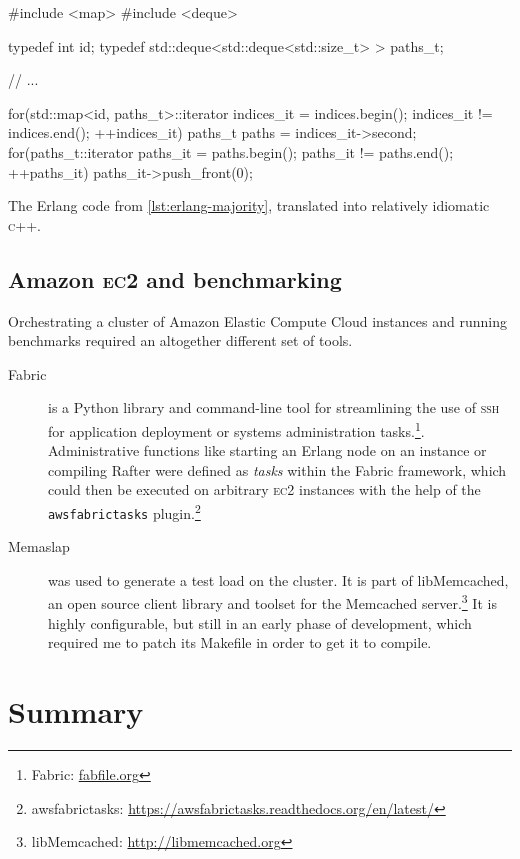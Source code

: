 \documentclass[draft,11pt,chapterprefix=true,toc=bibliography,numbers=noendperiod,
               footnotes=multiple,twoside]{scrreprt}
\newcommand{\ECC}[0]{\textsc{ec}2 }
\begin{document}
\begin{listing}[p]
    \begin{cppcode}
#include <map>
#include <deque>

typedef int id;
typedef std::deque<std::deque<std::size_t> > paths_t;

// ...

for(std::map<id, paths_t>::iterator indices_it = indices.begin();
        indices_it != indices.end(); ++indices_it) {
    paths_t paths = indices_it->second;
    for(paths_t::iterator paths_it = paths.begin();
            paths_it != paths.end(); ++paths_it) {
        paths_it->push_front(0);
    }
}
    \end{cppcode}
    \caption{The Erlang code from \autoref{lst:erlang-majority}, translated into relatively idiomatic \textsc{c}++.}
    \label{lst:cpp-majority}
\end{listing}


\subsection{Amazon \ECC and benchmarking\label{ssc:ec2-benchmarking}}

Orchestrating a cluster of Amazon Elastic Compute Cloud instances and running benchmarks required an altogether different set of tools.

\begin{description}
    \item[Fabric] is a Python library and command-line tool for streamlining the use of \textsc{ssh} for application deployment or systems administration tasks.\footnote{Fabric: \url{fabfile.org}}. Administrative functions like starting an Erlang node on an instance or compiling Rafter were defined as \emph{tasks} within the Fabric framework, which could then be executed on arbitrary \ECC instances with the help of the \texttt{awsfabrictasks} plugin.\footnote{awsfabrictasks: \url{https://awsfabrictasks.readthedocs.org/en/latest/}}
    \item[Memaslap] was used to generate a test load on the cluster. It is part of libMemcached, an open source client library and toolset for the Memcached server.\footnote{libMemcached: \url{http://libmemcached.org}} It is highly configurable, but still in an early phase of development, which required me to patch its Makefile in order to get it to compile.
\end{description}

\section{Summary}
\end{document}

